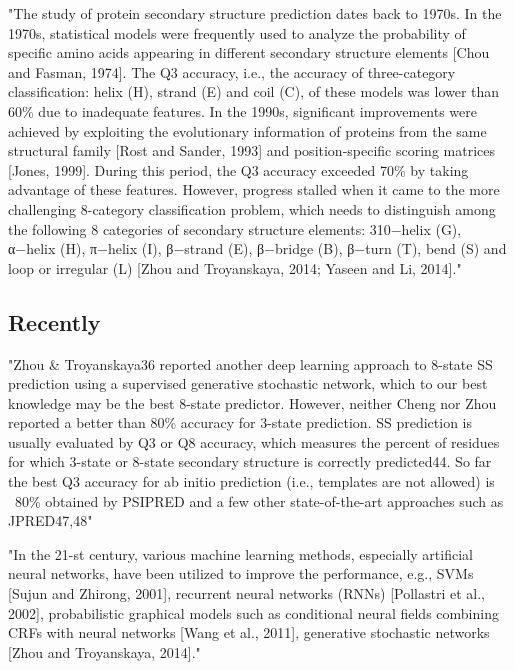 \documentclass[]{scrartcl}
\begin{document}
"The study of protein secondary structure prediction dates back to 1970s. In the 1970s, statistical models were frequently used to analyze the probability of specific amino acids appearing in different secondary structure elements [Chou and Fasman, 1974]. The Q3 accuracy, i.e., the accuracy of three-category classification: helix (H), strand (E) and coil (C), of these models was lower than 60\% due to inadequate features. In the 1990s, significant improvements were achieved by exploiting the evolutionary information of proteins from the same structural family [Rost and Sander, 1993] and position-specific scoring matrices [Jones, 1999]. During this period, the Q3 accuracy exceeded 70\% by taking advantage of these features. However, progress stalled when it came to the more challenging 8-category classification problem, which needs to distinguish among the following 8 categories of secondary structure elements: 310−helix (G), α−helix (H), π−helix (I), β−strand (E), β−bridge (B), β−turn (T), bend (S) and loop or irregular (L) [Zhou and Troyanskaya, 2014; Yaseen and Li, 2014]." \cite{Li2016}

\subsection{Recently}
"Zhou \& Troyanskaya36 reported another deep learning approach to 8-state SS prediction using a supervised generative stochastic network, which to our best knowledge may be the best 8-state predictor. However, neither Cheng nor Zhou reported a better than 80\% accuracy for 3-state prediction. SS prediction is usually evaluated by Q3 or Q8 accuracy, which measures the percent of residues for which 3-state or 8-state secondary structure is correctly predicted44. So far the best Q3 accuracy for ab initio prediction (i.e., templates are not allowed) is ~80\% obtained by PSIPRED and a few other state-of-the-art approaches such as JPRED47,48" \cite{Wang2016}

"In the 21-st century, various machine learning methods, especially artificial neural networks, have been utilized to improve the performance, e.g., SVMs [Sujun and Zhirong, 2001], recurrent neural networks (RNNs) [Pollastri et al., 2002], probabilistic graphical models such as conditional neural fields combining CRFs with neural networks [Wang et al., 2011], generative stochastic networks [Zhou and Troyanskaya, 2014]." \cite{Li2016}
\end{document}
